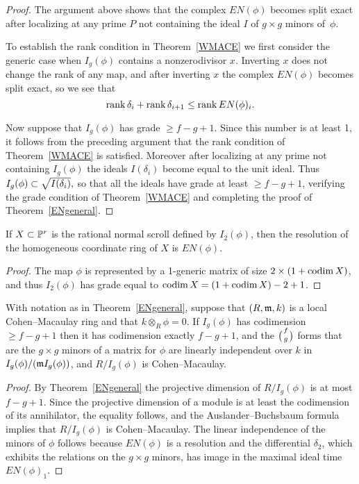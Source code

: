 \begin{proof}
\hskip-3pt %
The argument above shows that the
complex $EN(\phi)$ becomes split exact after localizing at any prime $P$ not containing
the ideal $I$ of $g\times g$ minors of~$\phi$. 

\hskip-3pt %
To establish the rank condition in Theorem~\ref{WMACE} we first consider the
generic case when $I_{g}(\phi)$ contains a nonzerodivisor $x$. Inverting $x$
does not change the rank of any map, and after inverting $x$ the
complex $EN(\phi)$ becomes
split exact, so we see that 
$$
\rank \delta_{i}+\rank \delta_{i+1} \leq \rank EN(\phi)_{i}.
$$

Now suppose that $I_{g}(\phi)$ has grade $\geq f-g+1$. Since this number is
at least 1, it follows from the preceding argument that the rank condition
of Theorem~\ref{WMACE} is satisfied. Moreover after localizing at any prime
not containing $I_{g}(\phi)$ the ideals $I(\delta_{i})$ become equal to the unit ideal.
Thus 
 $
\tsty %
I_{g}(\phi) \subset \sqrt{I(\delta_i)},
$
so that all the ideals have grade at least $\geq f-g+1$, verifying the grade condition
of Theorem~\ref{WMACE} and completing the proof of Theorem~\ref{ENgeneral}.
\end{proof}

\begin{corollary}\label{resolution of a scroll}
If $X\subset \PP^{r}$ is the rational normal scroll defined by $I_{2}(\phi)$, then the resolution of the homogeneous
coordinate ring of $X$ is $EN(\phi)$.
\unif
\end{corollary}

\begin{proof}
The map $\phi$ is represented by a 1-generic matrix of size $2\times (1+\codim X)$, and thus $I_{2}(\phi)$ has grade equal to $\codim X = (1+\codim X) - 2 +1$.
\end{proof}

\begin{corollary}\label{E-N cor}
With notation as in Theorem~\ref{ENgeneral}, suppose that $(R,\gm, k)$ is a local
Cohen--Macaulay ring
 and that
 $k\otimes_{R}\phi = 0$.
If $I_{g}(\phi)$
has codimension $\geq f-g+1$ then it has
codimension exactly $f-g+1$, 
and the $\tbinom{f}{g}$ forms
that are the $g\times g$ minors of a matrix for $\phi$ are linearly
independent over $k$ in $I_g(\phi)/(\gm I_g(\phi))$, and 
$R/I_g(\phi)$ is Cohen--Macaulay.
\unif
\end{corollary}

\begin{proof}
By Theorem~\ref{ENgeneral}  the projective dimension of
$R/I_g(\phi)$ is at most $f-g+1$. Since the projective dimension of a module
is at least the codimension of its annihilator, the equality follows,
and the Auslander--Buchsbaum formula implies that $R/I_g(\phi)$ is
%
%
Cohen--Macaulay. The linear independence of the minors of $\phi$ follows
because $EN(\phi)$ is a resolution and the differential $\delta_{2}$, which 
exhibits the relations on the $g\times g$ minors, has image in the
maximal ideal time $EN(\phi)_{1}$.
\end{proof}

